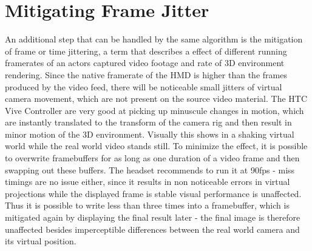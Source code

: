 %
\section{Mitigating Frame Jitter}

An additional step that can be handled by the same algorithm is the mitigation 
of frame or time jittering, a term that describes a effect of different running 
framerates of an actors captured video footage and rate of 3D environment 
rendering. Since the native framerate of the HMD is higher than the frames 
produced by the video feed, there will be noticeable small jitters of virtual 
camera movement, which are not present on the source video material. The HTC 
Vive Controller are very good at picking up minuscule changes in motion, which 
are instantly translated to the transform of the camera rig and then result in 
minor motion of the 3D environment. Visually this shows in a shaking virtual 
world while the real world video stands still.
\newline
To minimize the effect, it is possible to overwrite framebuffers for as long as 
one duration of a video frame and then swapping out these buffers. The headset 
recommends to run it at 90fps - miss timings are no issue either, since it 
results in non noticeable errors in virtual projections while the displayed 
frame is stable visual performance is unaffected. Thus it is possible to write 
less than three times into a framebuffer, which is mitigated again by 
displaying the final result later - the final image is therefore unaffected 
besides imperceptible differences between the real world camera and its virtual 
position.

